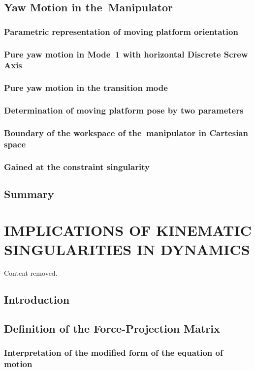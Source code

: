 \documentclass[DD]{iitmdiss}
\newcommand{\mlabel}[1]{\label{#1}}
\begin{document}
\section{Yaw Motion in the~\rps Manipulator} \mlabel{sc:yaw}
%
\subsection{Parametric representation of moving platform orientation}\mlabel{ss:quat}
%
\subsection{Pure yaw motion in Mode~1 with horizontal Discrete Screw Axis} \mlabel{ss:yaw1}
\subsection{Pure yaw motion in the transition mode}\mlabel{ss:yaw12}
\subsection{Determination of moving platform pose by two parameters} \mlabel{ss:antipar}
\subsection{Boundary of the workspace of the~\rps manipulator in Cartesian space}\mlabel{ss:wsb}
\subsection{Gained \dof at the constraint singularity}\mlabel{ss:constrsing}
\section{Summary}
%
\chapter{IMPLICATIONS OF KINEMATIC SINGULARITIES IN DYNAMICS}\mlabel{ch:dynamics}
%
Content removed.
%
\section{Introduction}
%
\section{Definition of the Force-Projection Matrix}
%
%
\subsection{Interpretation of the modified form of the equation of motion}
%
%
\end{document}
